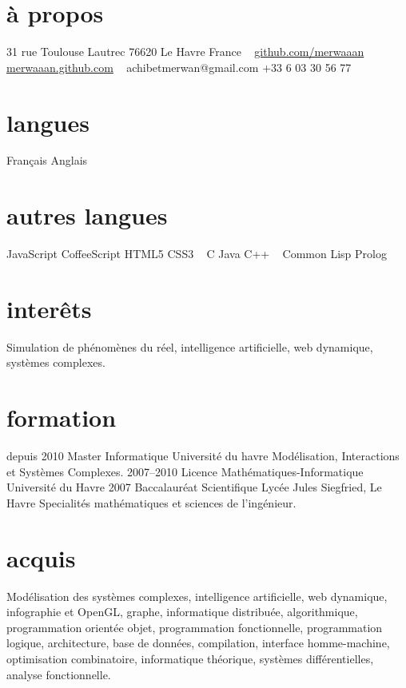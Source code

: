 \documentclass[]{friggeri-cv}
\begin{document}
       {}

\begin{aside}
  \section{à propos}
    31 rue Toulouse Lautrec
    76620 Le Havre
    France
    ~
    \href{http://github.com/merwaaan}{github.com/merwaaan}
    \href{http://merwaaan.github.com}{merwaaan.github.com}
    ~
    achibetmerwan{}@gmail.com
    +33 6 03 30 56 77
  \section{langues}
    Français
    Anglais
  \section{autres langues}
    JavaScript
    CoffeeScript
    HTML5
    CSS3
    ~
    C
    Java
    C++
    ~
    Common Lisp
    Prolog
\end{aside}

\section{interêts}

Simulation de phénomènes du réel, intelligence artificielle, web
dynamique, systèmes complexes.

\section{formation}

\begin{entrylist}
  \entry
    {depuis 2010}
    {Master Informatique}
    {Université du havre}
    {Modélisation, Interactions et Systèmes Complexes.}
  \entry
    {2007–2010}
    {Licence Mathématiques-Informatique}
    {Université du Havre}
    {}
  \entry
    {2007}
    {Baccalauréat Scientifique}
    {Lycée Jules Siegfried, Le Havre}
    {Specialités mathématiques et sciences de l'ingénieur.}
\end{entrylist}

\section{acquis}

Modélisation des systèmes complexes, intelligence artificielle, web
dynamique, infographie et OpenGL, graphe, informatique distribuée,
algorithmique, programmation orientée objet, programmation
fonctionnelle, programmation logique, architecture, base de données,
compilation, interface homme-machine, optimisation combinatoire,
informatique théorique, systèmes différentielles, analyse
fonctionnelle.
\end{document}

